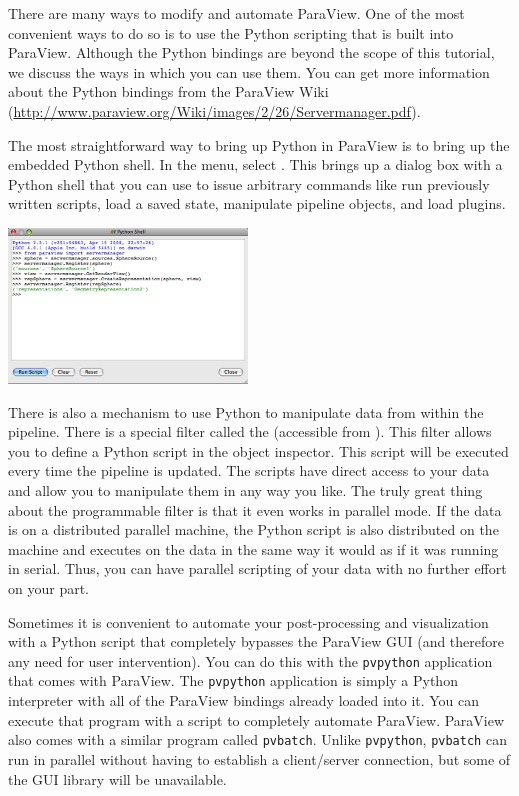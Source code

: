 There are many ways to modify and automate ParaView.  One of the most
convenient ways to do so is to use the Python scripting that is built into
ParaView.  Although the Python bindings are beyond the scope of this
tutorial, we discuss the ways in which you can use them.  You can get more
information about the Python bindings from the ParaView Wiki
(\href{http://www.paraview.org/Wiki/images/2/26/Servermanager.pdf}{http://www.paraview.org/Wiki/images/2/26/Servermanager.pdf}).

The most straightforward way to bring up Python in ParaView is to bring up
the embedded Python shell.  In the menu, select  \ra {}.  This brings up a dialog box with a Python shell that you can use
to issue arbitrary commands like run previously written scripts, load a
saved state, manipulate pipeline objects, and load plugins.

\begin{inlinefig}
  \includegraphics[width=2.5in]{images/PythonShell}
\end{inlinefig}

There is also a mechanism to use Python to manipulate data from within the
pipeline.  There is a special filter called the  (accessible from  \ra {} \ra
{}).  This filter allows you to define a Python
script in the object inspector.  This script will be executed every time
the pipeline is updated.  The scripts have direct access to your data and
allow you to manipulate them in any way you like.  The truly great thing
about the programmable filter is that it even works in parallel mode.  If
the data is on a distributed parallel machine, the Python script is also
distributed on the machine and executes on the data in the same way it
would as if it was running in serial.  Thus, you can have parallel
scripting of your data with no further effort on your part.

Sometimes it is convenient to automate your post-processing and
visualization with a Python script that completely bypasses the ParaView
GUI (and therefore any need for user intervention).  You can do this with
the \texttt{pvpython} application that comes with ParaView.  The
\texttt{pvpython} application is simply a Python interpreter with all of
the ParaView bindings already loaded into it.  You can execute that program
with a script to completely automate ParaView.  ParaView also comes with a
similar program called \texttt{pvbatch}.  Unlike \texttt{pvpython},
\texttt{pvbatch} can run in parallel without having to establish a
client/server connection, but some of the GUI library will be unavailable.


